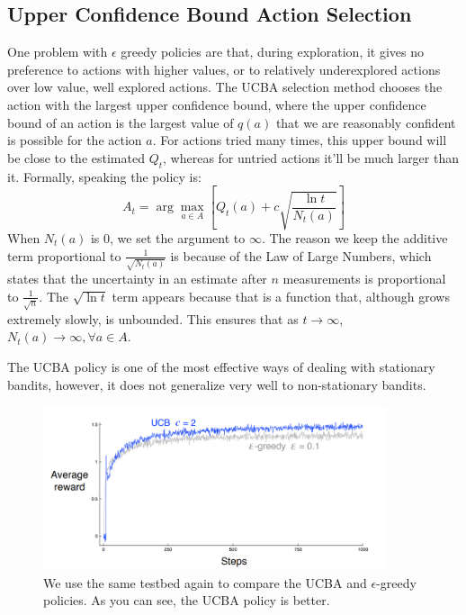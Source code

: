 \documentclass[12pt]{report}
\begin{document}
\subsection{Upper Confidence Bound Action Selection}
One problem with $\epsilon$ greedy policies are that, during exploration, it gives no preference to actions with higher values, or to relatively underexplored actions over low value, well explored actions.
The UCBA selection method chooses the action with the largest upper confidence bound, where the upper confidence bound of an action is the largest value of $q(a)$ that we are reasonably confident is possible for the action $a$.
For actions tried many times, this upper bound will be close to the estimated $Q_{t}$, whereas for untried actions it'll be much larger than it. Formally, speaking the policy is:
\begin{equation}
    A_{t} = \arg\max_{a \in A}\left[Q_{t}(a) + c\sqrt{\frac{\ln t}{N_{t}(a)}}\right]
\end{equation}
When $N_{t}(a)$ is $0$, we set the argument to $\infty$. The reason we keep the additive term proportional to $\frac{1}{\sqrt{N_{t}(a)}}$ is because of the Law of Large Numbers, 
which states that the uncertainty in an estimate after $n$ measurements is proportional to $\frac{1}{\sqrt{n}}$. The $\sqrt{\ln t}$ term appears because that is a function that, although grows extremely slowly,
is unbounded. This ensures that as $t \rightarrow \infty$, $N_{t}(a) \rightarrow \infty, \forall a \in A$. 

The UCBA policy is one of the most effective ways of dealing with stationary bandits, however, it does not generalize very well 
to non-stationary bandits.
\begin{figure}[h!]
    \centering
    \includegraphics[width=0.9\textwidth]{images/UCBA.png}
    \caption{We use the same testbed again to compare the UCBA and $\epsilon$-greedy policies. As you can see, the UCBA policy is better.}
\end{figure}
\end{document}
